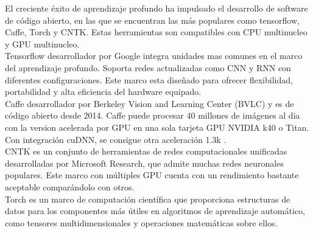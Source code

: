 El creciente éxito de aprendizaje profundo ha impulsado el desarrollo de software de código abierto, en las que se encuentran las más populares como tensorflow, Caffe, Torch y CNTK. Estas herramientas son compatibles con CPU multinucleo y GPU multinucleo\citep{shi2016benchmarking,liu2020application}.\\

Tensorflow desarrollador por Google integra unidades mas comunes en el marco del aprendizaje profundo. Soporta redes actualizadas como CNN y RNN con diferentes configuraciones. Este marco esta diseñado para ofrecer flexibilidad, portabilidad y alta eficiencia del hardware equipado.\\

Caffe desarrollador por Berkeley Vision and Learning Center (BVLC) y es de código abierto desde 2014. Caffe puede procesar 40 millones de imágenes al dia con la version acelerada por GPU en una sola tarjeta GPU NVIDIA k40 o Titan. Con integración cuDNN, se consigue otra aceleración 1.3k \citep{chetlur2014cudnn}.\\

CNTK es un conjunto de herramientas de redes computacionales unificadas desarrolladas por Microsoft Research, que admite muchas redes neuronales populares. Este marco con múltiples GPU cuenta con un rendimiento bastante aceptable comparándolo con otros\citep{huang2015microsoft}.\\

Torch es un marco de computación científica que proporciona estructuras de datos para los componentes más útiles en algoritmos de aprendizaje automático, como tensores multidimensionales y operaciones matemáticas sobre ellos.\\
